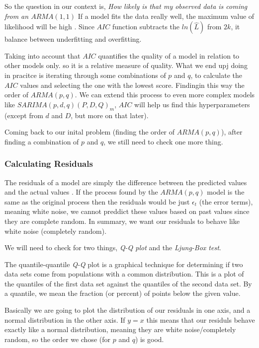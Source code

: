 \documentclass[journal]{IEEEtran}
\begin{document}
So the question in our context is, \emph{How likely is that my observed data
is coming from an $ARMA(1,1)$} If a model fits the data really well, the
maximum value of likelihood will be high \cite{timeseries}. Since $AIC$
function subtracts the $ln(\hat{L})$ from $2k$, it balance between
underfitting and overfitting.

Taking into account that $AIC$ quantifies the quality of a model in relation
to other models only.  so it is a relative measure of quality.  What we end
upj doing in pracitce is iterating through some combinations of $p$ and $q$,
to calculate the $AIC$ values and selecting the one with the lowest score.
Findingin this way the order of $ARMA(p,q)$. We can extend this process to
even more complex models like $SARIMA(p,d,q)(P,D,Q)_m$, $AIC$ will help us
find this hyperparameters (except from $d$ and $D$, but more on that later).

Coming back to our inital problem (finding the order of $ARMA(p,q)$), after
finding a combination of $p$ and $q$, we still need to check one more thing.

\subsubsection{Calculating Residuals}\label{sub:resid}

The residuals of a model are simply the difference between the predicted
values and the actual values \cite{timeseries}.  If the process found by the
$ARMA(p,q)$ model is the same as the original process then the residuals would
be just $\epsilon_t$ (the error terms), meaning white noise, we cannot
preddict these values based on past values since they are complete random. In
summary, we want our residuals to behave like white noise (completely random).

We will need to check for two things, \emph{Q-Q plot} and the \emph{Ljung-Box
test}.

The quantile-quantile \emph{Q-Q} plot is a graphical technique for determining
if two data sets come from populations with a common distribution.  This is a
plot of the quantiles of the first data set against the quantiles of the
second data set. By a quantile, we mean the fraction (or percent) of points
below the given value. \cite{qq}

Basically we are going to plot the distribution of our residuals in one axis,
and a normal distribution in the other axis. If $y=x$ this means that our
residuls behave exactly like a normal distribution, meaning they are white
noise/completely random, so the order we chose (for $p$ and $q$) is good.
\end{document}
